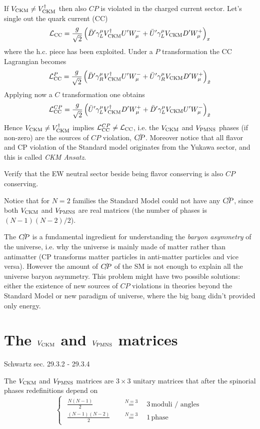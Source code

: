 \documentclass[TheoreticalPhy_ModB.tex]{subfiles}
\begin{document}
If $V_{\text{CKM}}\neq V_{\text{CKM}}^\dagger$ then also $CP$ is violated in the charged current sector. Let's single out the quark current (CC)
\[\mathcal L_{\text{CC}}=\frac g{\sqrt2}\left(\bar D'\gamma^\mu_LV_{\text{CKM}}^\dagger U'W_\mu^-+\bar U'\gamma_L^\mu V_{\text{CKM}} D'W_\mu^+\right)_x\]
where the h.c. piece has been exploited. Under a $P$ transformation the CC Lagrangian becomes 
\[\mathcal L_{\text{CC}}^P=\frac g{\sqrt2}\left(\bar D'\gamma^\mu_RV_{\text{CKM}}^\dagger U'W_\mu^-+\bar U'\gamma_R^\mu V_{\text{CKM}} D'W_\mu^+\right)_{\tilde x}\]
Applying now a $C$ transformation one obtains
\[\mathcal L_{\text{CC}}^{CP}=\frac g{\sqrt2}\left(\bar U'\gamma_L^\mu V_{\text{CKM}}^\dagger D'W_\mu^++\bar D'\gamma_L^\mu V_{\text{CKM}} U'W_\mu^-\right)_{\tilde x}\]
Hence $V_{\text{CKM}}\neq V_{\text{CKM}}^\dagger$ implies $\mathcal L_{\text{CC}}^{CP}\neq\mathcal L_{\text{CC}}$, i.e. the $V_{\text{CKM}}$ and $V_{\text{PMNS}}$ phases (if non-zero) are the sources of $CP$ violation, $\slashed{CP}$. Moreover notice that all flavor and CP violation of the Standard model originates from the Yukawa sector, and this is called \emph{CKM Ansatz}. 

\begin{exercise}
Verify that the EW neutral sector beside being flavor conserving is also $CP$ conserving.
\end{exercise}

Notice that for $N=2$ families the Standard Model could not have any $\slashed{CP}$, since both $V_{\text{CKM}}$ and $V_{\text{PMNS}}$ are real matrices (the number of phases is $(N-1)(N-2)/2$).

The $\slashed{CP}$ is a fundamental ingredient for understanding the \emph{baryon asymmetry} of the universe, i.e. why the universe is mainly made of matter rather than antimatter (CP transforms matter particles in anti-matter particles and vice versa). However the amount of $\slashed{CP}$ of the SM is not enough to explain all the universe baryon asymmetry. This problem might have two possible solutions: either the existence of new sources of $CP$ violations in theories beyond the Standard Model or new paradigm of universe, where the big bang didn't provided only energy. 

\chapter{The $V_{\text{CKM}}$ and $V_{\text{PMNS}}$ matrices}
\textsf{Schwartz sec. 29.3.2 - 29.3.4}

The $V_{\text{CKM}}$ and $V_{\text{PMNS}}$ matrices are $3\times3$ unitary matrices that after the spinorial phases redefinitions depend on 
\[\begin{cases}\begin{aligned}
\frac{N(N-1)}2\quad&\overset{N=3}{=}\quad3\,\text{moduli / angles}\\
\frac{(N-1)(N-2)}2\quad&\overset{N=3}{=}\quad1\,\text{phase}
\end{aligned}\end{cases}\]
\end{document}
